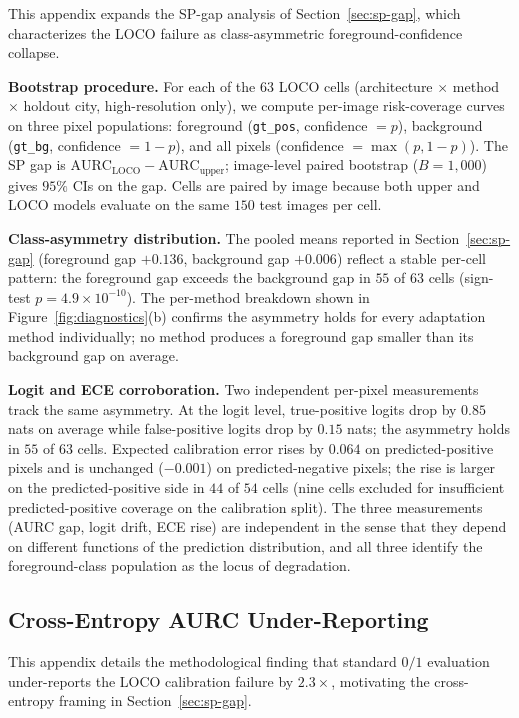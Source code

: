 This appendix expands the SP-gap analysis of Section~\ref{sec:sp-gap}, which characterizes the LOCO failure as class-asymmetric foreground-confidence collapse.

\textbf{Bootstrap procedure.} For each of the $63$ LOCO cells (architecture $\times$ method $\times$ holdout city, high-resolution only), we compute per-image risk-coverage curves on three pixel populations: foreground (\texttt{gt\_pos}, confidence $= p$), background (\texttt{gt\_bg}, confidence $= 1-p$), and all pixels (confidence $= \max(p, 1-p)$). The SP gap is $\text{AURC}_{\text{LOCO}} - \text{AURC}_{\text{upper}}$; image-level paired bootstrap ($B = 1{,}000$) gives $95\%$ CIs on the gap. Cells are paired by image because both upper and LOCO models evaluate on the same $150$ test images per cell.

\textbf{Class-asymmetry distribution.} The pooled means reported in Section~\ref{sec:sp-gap} (foreground gap $+0.136$, background gap $+0.006$) reflect a stable per-cell pattern: the foreground gap exceeds the background gap in $55$ of $63$ cells (sign-test $p = 4.9 \times 10^{-10}$). The per-method breakdown shown in Figure~\ref{fig:diagnostics}(b) confirms the asymmetry holds for every adaptation method individually; no method produces a foreground gap smaller than its background gap on average.

\textbf{Logit and ECE corroboration.} Two independent per-pixel measurements track the same asymmetry. At the logit level, true-positive logits drop by $0.85$ nats on average while false-positive logits drop by $0.15$ nats; the asymmetry holds in $55$ of $63$ cells. Expected calibration error rises by $0.064$ on predicted-positive pixels and is unchanged ($-0.001$) on predicted-negative pixels; the rise is larger on the predicted-positive side in $44$ of $54$ cells (nine cells excluded for insufficient predicted-positive coverage on the calibration split). The three measurements (AURC gap, logit drift, ECE rise) are independent in the sense that they depend on different functions of the prediction distribution, and all three identify the foreground-class population as the locus of degradation.

\subsection{Cross-Entropy AURC Under-Reporting}
\label{app:zeroone-ce}

This appendix details the methodological finding that standard $0/1$ evaluation under-reports the LOCO calibration failure by $2.3\times$, motivating the cross-entropy framing in Section~\ref{sec:sp-gap}.

